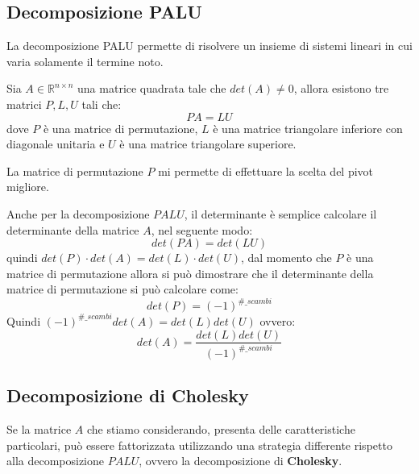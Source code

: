 \subsection{Decomposizione PALU}
La decomposizione PALU permette di risolvere un insieme di sistemi lineari in
cui varia solamente il termine noto.
\begin{teorema}
    Sia $A \in \mathbb{R}^{n\times n}$ una matrice quadrata tale che $det(A) \neq 0$,
    allora esistono tre matrici $P,L,U$ tali che:
    \begin{equation}
        PA=LU
    \end{equation}
    dove $P$ è una matrice di permutazione, $L$ è una matrice triangolare inferiore
    con diagonale unitaria e $U$ è una matrice triangolare superiore.
\end{teorema}
La matrice di permutazione $P$ mi permette di effettuare la scelta del pivot migliore.
\begin{nota}
    Anche per la decomposizione $PALU$, il determinante è semplice calcolare
    il determinante della matrice $A$, nel seguente modo:
    \begin{equation*}
        det(PA) = det(LU)
    \end{equation*}
    quindi $det(P) \cdot det(A) = det(L) \cdot det(U)$, dal momento che $P$ è
    una matrice di permutazione allora si può dimostrare che il determinante della
    matrice di permutazione si può calcolare come:
    \begin{equation*}
        det(P) = (-1)^{\#\_scambi}
    \end{equation*}
    Quindi $(-1)^{\#\_scambi}det(A) = det(L)det(U)$ ovvero:
    \begin{equation*}
        det(A) = \frac{det(L)det(U)}{(-1)^{\#\_scambi}}
    \end{equation*}
\end{nota}
\subsection{Decomposizione di Cholesky}
Se la matrice $A$ che stiamo considerando, presenta delle caratteristiche
particolari, può essere fattorizzata utilizzando una strategia differente
rispetto alla decomposizione $PALU$, ovvero la decomposizione di \textbf{Cholesky}.

